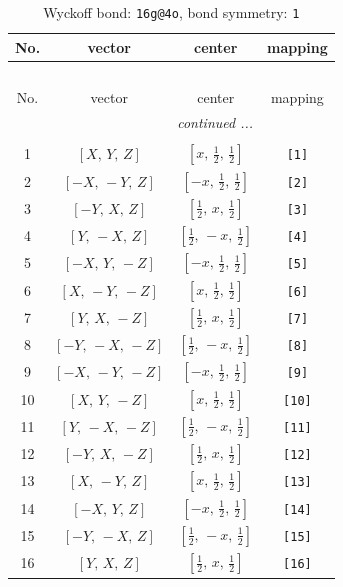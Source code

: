 \documentclass[fleqn,8pt]{jsarticle}
\begin{document}
\begin{longtable}{cccc}
\caption{Wyckoff bond: {\tt 16g@4o}, bond symmetry: {\tt 1}}
 \\
 \hline \hline
No. & vector & center & mapping \\ \hline \endfirsthead

\multicolumn{3}{l}{\tablename\ \thetable{}} \\
 \hline \hline
No. & vector & center & mapping \\ \hline \endhead

 \hline \hline
\multicolumn{3}{r}{\footnotesize\it continued ...} \\ \endfoot

 \hline \hline
\multicolumn{3}{r}{} \\ \endlastfoot

1 & $\left[ X,\, Y,\, Z \right]$ & $\left[ x,\, \frac{1}{2},\, \frac{1}{2} \right]$ & {\tt [1]} \\ \hline
2 & $\left[ - X,\, - Y,\, Z \right]$ & $\left[ - x,\, \frac{1}{2},\, \frac{1}{2} \right]$ & {\tt [2]} \\ \hline
3 & $\left[ - Y,\, X,\, Z \right]$ & $\left[ \frac{1}{2},\, x,\, \frac{1}{2} \right]$ & {\tt [3]} \\ \hline
4 & $\left[ Y,\, - X,\, Z \right]$ & $\left[ \frac{1}{2},\, - x,\, \frac{1}{2} \right]$ & {\tt [4]} \\ \hline
5 & $\left[ - X,\, Y,\, - Z \right]$ & $\left[ - x,\, \frac{1}{2},\, \frac{1}{2} \right]$ & {\tt [5]} \\ \hline
6 & $\left[ X,\, - Y,\, - Z \right]$ & $\left[ x,\, \frac{1}{2},\, \frac{1}{2} \right]$ & {\tt [6]} \\ \hline
7 & $\left[ Y,\, X,\, - Z \right]$ & $\left[ \frac{1}{2},\, x,\, \frac{1}{2} \right]$ & {\tt [7]} \\ \hline
8 & $\left[ - Y,\, - X,\, - Z \right]$ & $\left[ \frac{1}{2},\, - x,\, \frac{1}{2} \right]$ & {\tt [8]} \\ \hline
9 & $\left[ - X,\, - Y,\, - Z \right]$ & $\left[ - x,\, \frac{1}{2},\, \frac{1}{2} \right]$ & {\tt [9]} \\ \hline
10 & $\left[ X,\, Y,\, - Z \right]$ & $\left[ x,\, \frac{1}{2},\, \frac{1}{2} \right]$ & {\tt [10]} \\ \hline
11 & $\left[ Y,\, - X,\, - Z \right]$ & $\left[ \frac{1}{2},\, - x,\, \frac{1}{2} \right]$ & {\tt [11]} \\ \hline
12 & $\left[ - Y,\, X,\, - Z \right]$ & $\left[ \frac{1}{2},\, x,\, \frac{1}{2} \right]$ & {\tt [12]} \\ \hline
13 & $\left[ X,\, - Y,\, Z \right]$ & $\left[ x,\, \frac{1}{2},\, \frac{1}{2} \right]$ & {\tt [13]} \\ \hline
14 & $\left[ - X,\, Y,\, Z \right]$ & $\left[ - x,\, \frac{1}{2},\, \frac{1}{2} \right]$ & {\tt [14]} \\ \hline
15 & $\left[ - Y,\, - X,\, Z \right]$ & $\left[ \frac{1}{2},\, - x,\, \frac{1}{2} \right]$ & {\tt [15]} \\ \hline
16 & $\left[ Y,\, X,\, Z \right]$ & $\left[ \frac{1}{2},\, x,\, \frac{1}{2} \right]$ & {\tt [16]} \\
\end{longtable}
\end{document}
